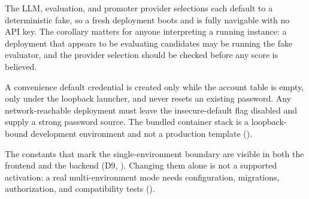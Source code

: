  The LLM, evaluation, and promoter
provider selections each default to a deterministic fake, so a fresh deployment
boots and is fully navigable with no API key. The corollary matters for anyone
interpreting a running instance: a deployment that appears to be evaluating
candidates may be running the fake evaluator, and the provider selection should be
checked before any score is believed.

 A convenience default credential is
created only while the account table is empty, only under the loopback launcher, and
never resets an existing password. Any network-reachable deployment must leave the
insecure-default flag disabled and supply a strong password source. The bundled
container stack is a loopback-bound development environment and not a production
template ().

 The constants that mark
the single-environment boundary are visible in both the frontend and the backend
(D9, ). Changing them alone is not a supported activation: a
real multi-environment mode needs configuration, migrations, authorization, and
compatibility tests ().
